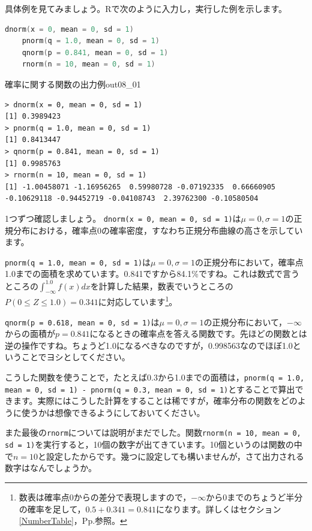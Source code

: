 \documentclass{ltjbook}
\begin{document}
具体例を見てみましょう。Rで次のように入力し，実行した例を示します。

\begin{lstlisting}[language=c++,label={code:08_01},caption={確率に関する関数使用例}]
    dnorm(x = 0, mean = 0, sd = 1)
    pnorm(q = 1.0, mean = 0, sd = 1)
    qnorm(p = 0.841, mean = 0, sd = 1)
    rnorm(n = 10, mean = 0, sd = 1)
\end{lstlisting}

\begin{Rscreen}{確率に関する関数の出力例}{out08_01}
	\begin{verbatim}
> dnorm(x = 0, mean = 0, sd = 1)
[1] 0.3989423
> pnorm(q = 1.0, mean = 0, sd = 1)
[1] 0.8413447
> qnorm(p = 0.841, mean = 0, sd = 1)
[1] 0.9985763
> rnorm(n = 10, mean = 0, sd = 1)
[1] -1.00458071 -1.16956265  0.59980728 -0.07192335  0.66660905 -0.10629118 -0.94452719 -0.04108743  2.39762300 -0.10580504
\end{verbatim}
\end{Rscreen}

1つずつ確認しましょう。
\texttt{dnorm(x = 0, mean = 0, sd = 1)}は$\mu=0,\sigma=1$の正規分布における，確率点0の確率密度，すなわち正規分布曲線の高さを示しています。

\texttt{pnorm(q = 1.0, mean = 0, sd = 1)}は$\mu=0,\sigma=1$の正規分布において，確率点1.0までの面積を求めています。0.841ですから84.1\%ですね。これは数式で言うところの$\int_{-\infty}^{1.0} f(x)dx$を計算した結果，数表でいうところの$P(0\le Z \le 1.0)=0.341$に対応しています\footnote{数表は確率点0からの差分で表現しますので，$-\infty$から$0$までのちょうど半分の確率を足して，$0.5+0.341=0.841$になります。詳しくはセクション\ref{NumberTable}，Pp.\pageref{NumberTable}参照。}。

\texttt{qnorm(p = 0.618, mean = 0, sd = 1)}は$\mu=0,\sigma=1$の正規分布において，$-\infty$からの面積が$p=0.841$になるときの確率点を答える関数です。先ほどの関数とは逆の操作ですね。ちょうど1.0になるべきなのですが，0.998563なのでほぼ1.0ということでヨシとしてください。

こうした関数を使うことで，たとえば0.3から1.0までの面積は，\texttt{pnorm(q = 1.0, mean = 0, sd = 1) - pnorm(q = 0.3, mean = 0, sd = 1)}とすることで算出できます。実際にはこうした計算をすることは稀ですが，確率分布の関数をどのように使うかは想像できるようにしておいてください。

また最後の\texttt{rnorm}については説明がまだでした。関数\texttt{rnorm(n = 10, mean = 0, sd = 1)}を実行すると，10個の数字が出てきています。10個というのは関数の中で$n=10$と設定したからです。幾つに設定しても構いませんが，さて出力される数字はなんでしょうか。
\end{document}
